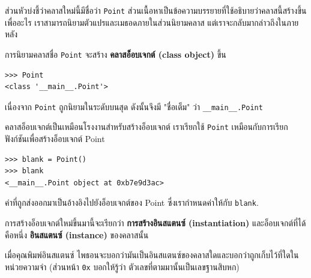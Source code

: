 ส่วนหัวบ่งชี้ว่าคลาสใหม่นี้มีชื่อว่า {\tt Point}
ส่วนเนื้อหาเป็นข้อความบรรยายที่ใช้อธิบายว่าคลาสนี้สร้างขึ้นเพื่ออะไร 
เราสามารถนิยามตัวแปรและเมธอดภายในส่วนนิยามคลาส แต่เราจะกลับมากล่าวถึงในภายหลัง

การนิยามคลาสชื่อ {\tt Point} จะสร้าง {\bf คลาสอ็อบเจกต์ (class object)} ขึ้น

\begin{verbatim}
>>> Point
<class '__main__.Point'>
\end{verbatim}
%

เนื่องจาก {\tt Point} ถูกนิยามในระดับบนสุด ดังนั้นจึงมี "ชื่อเต็ม" ว่า \verb"__main__.Point"



คลาสอ็อบเจกต์เป็นเหมือนโรงงานสำหรับสร้างอ็อบเจกต์ เราเรียกใช้ {\tt Point} เหมือนกับการเรียกฟังก์ชันเพื่อสร้างอ็อบเจกต์ Point

\begin{verbatim}
>>> blank = Point()
>>> blank
<__main__.Point object at 0xb7e9d3ac>
\end{verbatim}
%

ค่าที่ถูกส่งออกมาเป็นอ้างอิงไปยังอ็อบเจกต์ของ Point ซึ่งเรากำหนดค่าให้กับ {\tt blank}.  


การสร้างอ็อบเจกต์ใหม่ขึ้นมานี้จะเรียกว่า  
{\bf การสร้างอินสแตนซ์ (instantiation)} และอ็อบเจกต์ที่ได้คือหนึ่ง {\bf อินสแตนซ์ (instance)}  ของคลาสนั้น



เมื่อคุณพิมพ์อินสแตนซ์ ไพธอนจะบอกว่ามันเป็นอินสแตนซ์ของคลาสใดและบอกว่าถูกเก็บไว้ที่ใดในหน่วยความจำ (ส่วนหน้า
{\tt 0x} บอกให้รู้ว่า ตัวเลขที่ตามมานั้นเป็นเลขฐานสิบหก)

